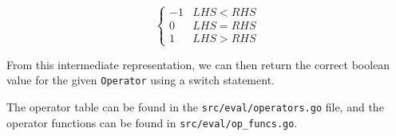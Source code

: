 \[ \begin{cases} 
    -1 & LHS < RHS \\
    0  & LHS = RHS \\
    1  & LHS > RHS 
 \end{cases}
\]

From this intermediate representation, we can then return the correct boolean value for the given \verb|Operator| using a switch statement.





The operator table can be found in the \verb|src/eval/operators.go| file, and the operator functions can be found in \verb|src/eval/op_funcs.go|.
